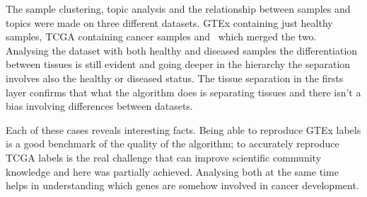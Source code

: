The sample clustering, topic analysis and the relationship between samples and topics were made on three different datasets. GTEx containing just healthy samples, TCGA containing cancer samples and~\cite{Wang2017} which merged the two. Analysing the dataset with both healthy and diseased samples the differentiation between tissues is still evident and going deeper in the hierarchy the separation involves also the healthy or diseased status. The tissue separation in the firsts layer confirms that what the algorithm does is separating tissues and there isn't a bias involving differences between datasets.

Each of these cases reveals interesting facts. Being able to reproduce GTEx labels is a good benchmark of the quality of the algorithm; to accurately reproduce TCGA labels is the real challenge that can improve scientific community knowledge and here was partially achieved. Analysing both at the same time helps in understanding which genes are somehow involved in cancer development.